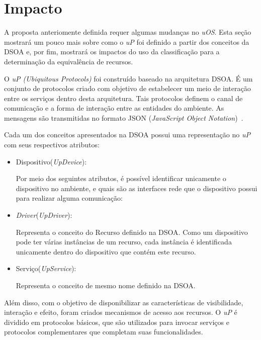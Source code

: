 \section{Impacto}
\label{sec:impactoUOS}

A proposta anteriomente definida requer algumas mudanças no \emph{uOS}. Esta seção mostrará um pouco mais sobre como o \emph{uP} foi definido a partir dos conceitos da DSOA e, por fim, mostrará os impactos do uso da classificação para a determinação da equivalência de recursos.

O \emph{uP (Ubiquitous Protocols)} foi construído baseado na arquitetura DSOA. É um conjunto de protocolos criado com objetivo de estabelecer um meio de interação entre os serviços dentro desta arquitetura. Tais protocolos definem o canal de comunicação e a forma de interação entre as entidades do ambiente. As mensagens são transmitidas no formato JSON (\emph{JavaScript Object Notation})~\cite{json}.

Cada um dos conceitos apresentados na DSOA possui uma representação no \emph{uP} com seus respectivos atributos:

\begin{itemize}
	\item Dispositivo(\emph{UpDevice}):
	
		Por meio dos seguintes atributos, é possível identificar unicamente o dispositivo no ambiente, e quais são as interfaces rede que o dispositivo possui para realizar alguma comunicação:

	\item \emph{Driver}(\emph{UpDriver}): 

		Representa o conceito do Recurso definido na DSOA. Como um dispositivo pode ter várias instâncias de um recurso, cada instância é identificada unicamente dentro do dispositivo que contém este recurso.

	\item Serviço(\emph{UpService}): 

		Representa o conceito de mesmo nome definido na DSOA.
\end{itemize}

Além disso, com o objetivo de disponibilizar as características de visibilidade, interação e efeito, foram criados mecanismos de acesso aos recursos. O \emph{uP} é dividido em protocolos básicos, que são utilizados para invocar serviços e protocolos complementares que completam suas funcionalidades.

